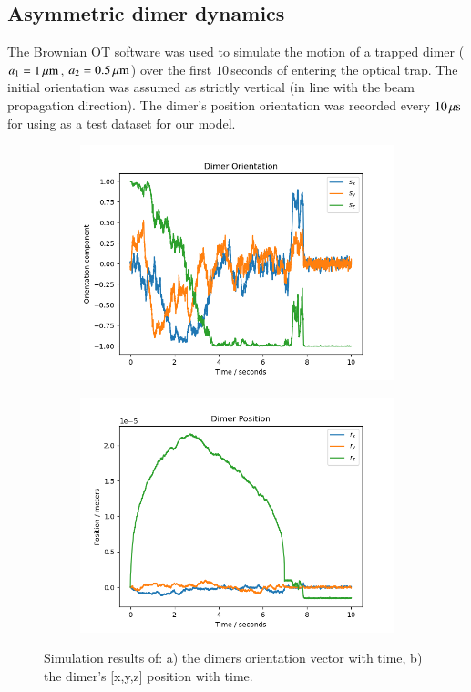 \documentclass[final, 3p]{elsarticle}
\begin{document}
\subsection{Asymmetric dimer dynamics}
\label{sec:3.1}

The Brownian OT software was used to simulate the motion of a trapped
dimer ($a_1=1\,{\rm \mu m}$, $a_2=0.5\,{\rm \mu m}$) over the first
$10$\,seconds of entering the optical trap.  The initial orientation
was assumed as strictly vertical (in line with the beam propagation
direction). The dimer's position orientation was recorded every
$10\,{\rm \mu s}$ for using as a test dataset for our model.

\begin{figure}[h]
	\label{fig:motion}
	\centering
	\begin{subfigure}{0.45\textwidth}
		\subcaption{}
		\includegraphics[width =\textwidth]{./Images/traj.png}
	\end{subfigure}
	\begin{subfigure}{0.45\textwidth}
		\subcaption{}
		\includegraphics[width=\textwidth]{./Images/pos.png}
	\end{subfigure}
	\caption{Simulation results of: a) the dimers orientation vector with time, b) the dimer's [x,y,z] position with time.}
\end{figure}
\end{document}
